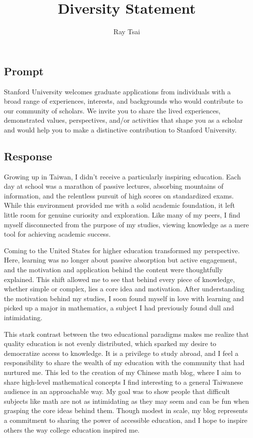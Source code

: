 \documentclass[12pt]{article}
\title{Diversity Statement}
\author{Ray Tsai}
\date{}
\begin{document}
\maketitle

\vspace{-0.25in}

\subsection*{Prompt}

Stanford University welcomes graduate applications from individuals with a broad range of
experiences, interests, and backgrounds who would contribute to our community of scholars. We invite
you to share the lived experiences, demonstrated values, perspectives, and/or activities that shape
you as a scholar and would help you to make a distinctive contribution to Stanford University.

\subsection*{Response}

Growing up in Taiwan, I didn't receive a particularly inspiring education. Each day at school was a
marathon of passive lectures, absorbing mountains of information, and the relentless pursuit of high
scores on standardized exams. While this environment provided me with a solid academic foundation,
it left little room for genuine curiosity and exploration. Like many of my peers, I find myself
disconnected from the purpose of my studies, viewing knowledge as a mere tool for achieving academic
success.

Coming to the United States for higher education transformed my perspective. Here, learning was no
longer about passive absorption but active engagement, and the motivation and application behind the
content were thoughtfully explained. This shift allowed me to see that behind every piece of
knowledge, whether simple or complex, lies a core idea and motivation. After understanding the
motivation behind my studies, I soon found myself in love with learning and picked up a major in
mathematics, a subject I had previously found dull and intimidating. 

This stark contrast between the two educational paradigms makes me realize that quality education is
not evenly distributed, which sparked my desire to democratize access to knowledge. It is a
privilege to study abroad, and I feel a responsibility to share the wealth of my education with the
community that had nurtured me. This led to the creation of my Chinese math blog, where I aim to
share high-level mathematical concepts I find interesting to a general Taiwanese audience in an
approachable way. My goal was to show people that difficult subjects like math are not as
intimidating as they may seem and can be fun when grasping the core ideas behind them. Though modest
in scale, my blog represents a commitment to sharing the power of accessible education, and I hope
to inspire others the way college education inspired me.
\end{document}
